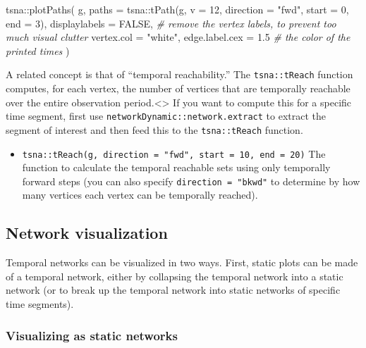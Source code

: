 \documentclass[
]{article}
\newenvironment{Shaded}{\begin{snugshade}}{\end{snugshade}}
\newcommand{\AttributeTok}[1]{\textcolor[rgb]{0.77,0.63,0.00}{#1}}
\newcommand{\CommentTok}[1]{\textcolor[rgb]{0.56,0.35,0.01}{\textit{#1}}}
\newcommand{\ConstantTok}[1]{\textcolor[rgb]{0.00,0.00,0.00}{#1}}
\newcommand{\DecValTok}[1]{\textcolor[rgb]{0.00,0.00,0.81}{#1}}
\newcommand{\FloatTok}[1]{\textcolor[rgb]{0.00,0.00,0.81}{#1}}
\newcommand{\FunctionTok}[1]{\textcolor[rgb]{0.00,0.00,0.00}{#1}}
\newcommand{\NormalTok}[1]{#1}
\newcommand{\SpecialCharTok}[1]{\textcolor[rgb]{0.00,0.00,0.00}{#1}}
\newcommand{\StringTok}[1]{\textcolor[rgb]{0.31,0.60,0.02}{#1}}
\providecommand{\tightlist}{%
  \setlength{\itemsep}{0pt}\setlength{\parskip}{0pt}}
\begin{document}
\begin{Shaded}
\begin{Highlighting}[]
\NormalTok{tsna}\SpecialCharTok{::}\FunctionTok{plotPaths}\NormalTok{(}
\NormalTok{  g,}
  \AttributeTok{paths =}\NormalTok{ tsna}\SpecialCharTok{::}\FunctionTok{tPath}\NormalTok{(g, }\AttributeTok{v =} \DecValTok{12}\NormalTok{, }\AttributeTok{direction =} \StringTok{"fwd"}\NormalTok{, }\AttributeTok{start =} \DecValTok{0}\NormalTok{, }\AttributeTok{end =} \DecValTok{3}\NormalTok{),}
  \AttributeTok{displaylabels =} \ConstantTok{FALSE}\NormalTok{,        }\CommentTok{\# remove the vertex labels, to prevent too much visual clutter}
  \AttributeTok{vertex.col =} \StringTok{"white"}\NormalTok{,}
  \AttributeTok{edge.label.cex =} \FloatTok{1.5}          \CommentTok{\# the color of the printed times}
\NormalTok{)}
\end{Highlighting}
\end{Shaded}

A related concept is that of ``temporal reachability.'' The
\texttt{tsna::tReach} function computes, for each vertex, the number of
vertices that are temporally reachable over the entire observation
period.\textless{}\br\textgreater{} If you want to compute this for a
specific time segment, first use
\texttt{networkDynamic::network.extract} to extract the segment of
interest and then feed this to the \texttt{tsna::tReach} function.

\begin{itemize}
\tightlist
\item
  \texttt{tsna::tReach(g,\ direction\ =\ "fwd",\ start\ =\ 10,\ end\ =\ 20)}
  The function to calculate the temporal reachable sets using only
  temporally forward steps (you can also specify
  \texttt{direction\ =\ "bkwd"} to determine by how many vertices each
  vertex can be temporally reached).
\end{itemize}

\hypertarget{network-visualization}{%
\subsection{Network visualization}\label{network-visualization}}

Temporal networks can be visualized in two ways. First, static plots can
be made of a temporal network, either by collapsing the temporal network
into a static network (or to break up the temporal network into static
networks of specific time segments).

\hypertarget{visualizing-as-static-networks}{%
\subsubsection{Visualizing as static
networks}\label{visualizing-as-static-networks}}
\end{document}
